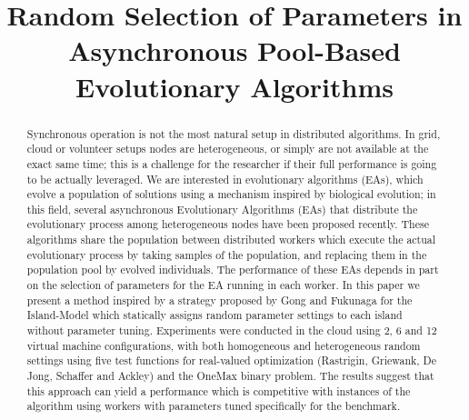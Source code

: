 \documentclass[conference]{IEEEtran}
\begin{document}
\title{Random Selection of Parameters in Asynchronous Pool-Based Evolutionary Algorithms\\
}

\author{
  \and
}

\maketitle

\begin{abstract}
  Synchronous operation is not the most natural setup in distributed algorithms. In grid,
cloud or volunteer setups nodes are heterogeneous, or simply are not
available at the exact same time; this is a challenge for the researcher if
their full performance is going to be actually leveraged. We are
interested in evolutionary algorithms (EAs), which evolve a population
of solutions using a mechanism inspired by biological evolution; in this field,
several asynchronous Evolutionary Algorithms (EAs) that distribute the
evolutionary process among heterogeneous nodes have
been proposed recently. These algorithms share the population between
distributed workers which execute the actual evolutionary
process by taking samples of the population, and replacing them in the
population pool by evolved individuals. The performance of these EAs
depends in part on the selection of parameters for the EA running in
each worker. In this paper we present a method inspired by a strategy
proposed by Gong and Fukunaga for the
Island-Model which statically assigns random parameter settings to
each island without parameter tuning. Experiments were conducted in the
cloud using 2, 6 and 12 virtual machine configurations, with
both homogeneous and heterogeneous random settings using five
test functions for real-valued optimization (Rastrigin, Griewank, De Jong, Schaffer
and Ackley) and the OneMax binary problem. The results suggest that this approach can yield
a performance which is competitive with instances of the
algorithm using workers with parameters tuned specifically for
the benchmark.
\end{abstract}
\end{document}
